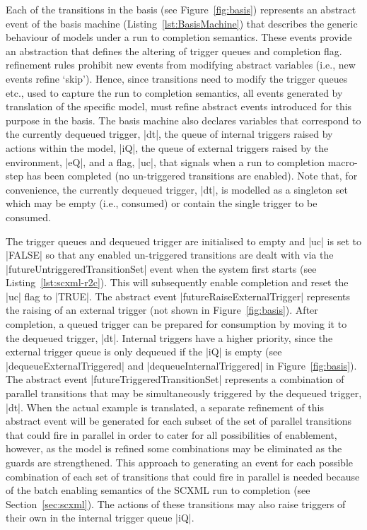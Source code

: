 Each of the transitions in the basis (see Figure~\ref{fig:basis}) represents an abstract event of the basis machine (Listing~\ref{lst:BasisMachine}) that describes the generic behaviour of models under a run to completion semantics.
These events provide an abstraction that defines the altering of trigger queues and completion flag. 
\EventB refinement rules prohibit new events from modifying abstract variables (i.e., new events refine `skip').
Hence, since \SCXML transitions need to modify the trigger queues etc., used to capture the \SCXML run to completion semantics, all events generated by translation of the specific \SCXML model,  must refine abstract events introduced for this purpose in the basis.
The basis machine also declares variables that correspond to the currently dequeued trigger,  |dt|, 
the queue of internal triggers raised by actions within the model, |iQ|, 
the queue of external triggers raised by the environment, |eQ|,
and a flag, |uc|, that signals when a run to completion macro-step has been completed 
(no un-triggered transitions are enabled). 
Note that, for convenience, the currently dequeued trigger, |dt|, is modelled as a singleton set which may be empty (i.e., consumed) or contain the single trigger to be consumed.

The trigger queues and dequeued trigger are initialised to empty and |uc| is set to |FALSE| so that any enabled un-triggered transitions are dealt with via the |futureUntriggeredTransitionSet| event when the system first starts (see Listing~\ref{lst:scxml-r2c}).
This will subsequently enable completion and reset the |uc| flag to |TRUE|.
The abstract event |futureRaiseExternalTrigger| represents the raising  of an external trigger (not shown in Figure~\ref{fig:basis}).    
After completion, a queued trigger can be prepared for consumption by moving it to the dequeued trigger, |dt|.
Internal triggers have a higher priority, since the external trigger queue is only dequeued if the |iQ| is empty (see |dequeueExternalTriggered| and |dequeueInternalTriggered| in Figure~\ref{fig:basis}).
The abstract event |futureTriggeredTransitionSet| represents a combination of parallel transitions that may be simultaneously triggered by the dequeued trigger, |dt|.
When the actual example \SCXML is translated, a separate refinement of this abstract event will be generated for each subset of the set of parallel transitions that could fire in parallel in order to cater for all possibilities of enablement, however, as the model is refined some combinations may be eliminated as the guards are strengthened.
This approach to generating an event for each possible combination of each set of transitions that could fire in parallel is needed because of the batch enabling semantics of the SCXML run to completion (see Section~\ref{sec:scxml}).
The actions of these transitions may also raise triggers of their own in the internal trigger queue |iQ|.


